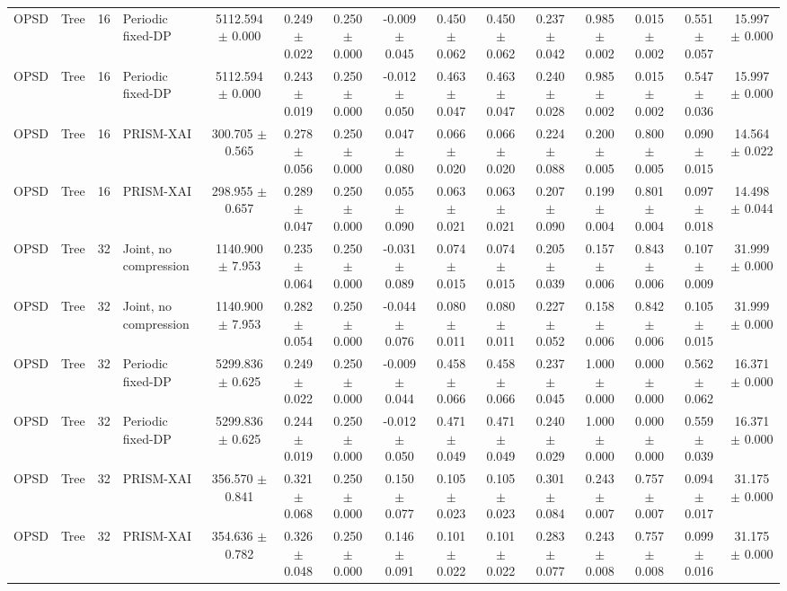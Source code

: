 \begin{tabular}{llllccccccccccc}
OPSD & Tree & 16 & Periodic fixed-DP & 5112.594 $\pm$ 0.000 & 0.249 $\pm$ 0.022 & 0.250 $\pm$ 0.000 & -0.009 $\pm$ 0.045 & 0.450 $\pm$ 0.062 & 0.450 $\pm$ 0.062 & 0.237 $\pm$ 0.042 & 0.985 $\pm$ 0.002 & 0.015 $\pm$ 0.002 & 0.551 $\pm$ 0.057 & 15.997 $\pm$ 0.000 \\
OPSD & Tree & 16 & Periodic fixed-DP & 5112.594 $\pm$ 0.000 & 0.243 $\pm$ 0.019 & 0.250 $\pm$ 0.000 & -0.012 $\pm$ 0.050 & 0.463 $\pm$ 0.047 & 0.463 $\pm$ 0.047 & 0.240 $\pm$ 0.028 & 0.985 $\pm$ 0.002 & 0.015 $\pm$ 0.002 & 0.547 $\pm$ 0.036 & 15.997 $\pm$ 0.000 \\
OPSD & Tree & 16 & PRISM-XAI & 300.705 $\pm$ 0.565 & 0.278 $\pm$ 0.056 & 0.250 $\pm$ 0.000 & 0.047 $\pm$ 0.080 & 0.066 $\pm$ 0.020 & 0.066 $\pm$ 0.020 & 0.224 $\pm$ 0.088 & 0.200 $\pm$ 0.005 & 0.800 $\pm$ 0.005 & 0.090 $\pm$ 0.015 & 14.564 $\pm$ 0.022 \\
OPSD & Tree & 16 & PRISM-XAI & 298.955 $\pm$ 0.657 & 0.289 $\pm$ 0.047 & 0.250 $\pm$ 0.000 & 0.055 $\pm$ 0.090 & 0.063 $\pm$ 0.021 & 0.063 $\pm$ 0.021 & 0.207 $\pm$ 0.090 & 0.199 $\pm$ 0.004 & 0.801 $\pm$ 0.004 & 0.097 $\pm$ 0.018 & 14.498 $\pm$ 0.044 \\
OPSD & Tree & 32 & Joint, no compression & 1140.900 $\pm$ 7.953 & 0.235 $\pm$ 0.064 & 0.250 $\pm$ 0.000 & -0.031 $\pm$ 0.089 & 0.074 $\pm$ 0.015 & 0.074 $\pm$ 0.015 & 0.205 $\pm$ 0.039 & 0.157 $\pm$ 0.006 & 0.843 $\pm$ 0.006 & 0.107 $\pm$ 0.009 & 31.999 $\pm$ 0.000 \\
OPSD & Tree & 32 & Joint, no compression & 1140.900 $\pm$ 7.953 & 0.282 $\pm$ 0.054 & 0.250 $\pm$ 0.000 & -0.044 $\pm$ 0.076 & 0.080 $\pm$ 0.011 & 0.080 $\pm$ 0.011 & 0.227 $\pm$ 0.052 & 0.158 $\pm$ 0.006 & 0.842 $\pm$ 0.006 & 0.105 $\pm$ 0.015 & 31.999 $\pm$ 0.000 \\
OPSD & Tree & 32 & Periodic fixed-DP & 5299.836 $\pm$ 0.625 & 0.249 $\pm$ 0.022 & 0.250 $\pm$ 0.000 & -0.009 $\pm$ 0.044 & 0.458 $\pm$ 0.066 & 0.458 $\pm$ 0.066 & 0.237 $\pm$ 0.045 & 1.000 $\pm$ 0.000 & 0.000 $\pm$ 0.000 & 0.562 $\pm$ 0.062 & 16.371 $\pm$ 0.000 \\
OPSD & Tree & 32 & Periodic fixed-DP & 5299.836 $\pm$ 0.625 & 0.244 $\pm$ 0.019 & 0.250 $\pm$ 0.000 & -0.012 $\pm$ 0.050 & 0.471 $\pm$ 0.049 & 0.471 $\pm$ 0.049 & 0.240 $\pm$ 0.029 & 1.000 $\pm$ 0.000 & 0.000 $\pm$ 0.000 & 0.559 $\pm$ 0.039 & 16.371 $\pm$ 0.000 \\
OPSD & Tree & 32 & PRISM-XAI & 356.570 $\pm$ 0.841 & 0.321 $\pm$ 0.068 & 0.250 $\pm$ 0.000 & 0.150 $\pm$ 0.077 & 0.105 $\pm$ 0.023 & 0.105 $\pm$ 0.023 & 0.301 $\pm$ 0.084 & 0.243 $\pm$ 0.007 & 0.757 $\pm$ 0.007 & 0.094 $\pm$ 0.017 & 31.175 $\pm$ 0.000 \\
OPSD & Tree & 32 & PRISM-XAI & 354.636 $\pm$ 0.782 & 0.326 $\pm$ 0.048 & 0.250 $\pm$ 0.000 & 0.146 $\pm$ 0.091 & 0.101 $\pm$ 0.022 & 0.101 $\pm$ 0.022 & 0.283 $\pm$ 0.077 & 0.243 $\pm$ 0.008 & 0.757 $\pm$ 0.008 & 0.099 $\pm$ 0.016 & 31.175 $\pm$ 0.000 \\
\bottomrule
\end{tabular}
